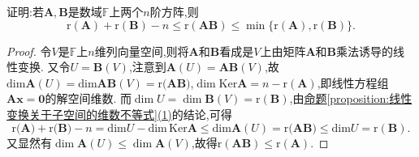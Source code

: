 \documentclass[../../main.tex]{subfiles}
\begin{document}
\begin{example}\label{example:4.243456}
证明:若\(\boldsymbol{A},\boldsymbol{B}\)是数域\(\mathbb{F}\)上两个\(n\)阶方阵,则
\[
\text{r}(\boldsymbol{A})+\text{r}(\boldsymbol{B})-n\leqslant \text{r}(\boldsymbol{A}\boldsymbol{B})\leqslant \min\{\text{r}(\boldsymbol{A}),\text{r}(\boldsymbol{B})\}.
\]
\end{example}
\begin{proof}
令\(V\)是\(\mathbb{F}\)上\(n\)维列向量空间,则将\(\boldsymbol{A}\)和\(\boldsymbol{B}\)看成是\(V\)上由矩阵\(\boldsymbol{A}\)和\(\boldsymbol{B}\)乘法诱导的线性变换. 又令\(U = \boldsymbol{B}(V)\),注意到\(\boldsymbol{A}(U)=\boldsymbol{A}\boldsymbol{B}(V)\),故\(\mathrm{dim}\boldsymbol{A}(U)=\mathrm{dim}\boldsymbol{AB}(V)=\mathrm{r(}\boldsymbol{AB})\),\(\dim\text{Ker}\boldsymbol{A}=n - \text{r}(\boldsymbol{A})\),即线性方程组\(\boldsymbol{A}\boldsymbol{x}=\boldsymbol{0}\)的解空间维数. 而\(\dim U=\dim\boldsymbol{B}(V)=\text{r}(\boldsymbol{B})\),由\hyperref[proposition:线性变换关于子空间的维数不等式]{命题\ref{proposition:线性变换关于子空间的维数不等式}(1)}的结论,可得
\[
\mathrm{r(}\boldsymbol{A})+\mathrm{r(}\boldsymbol{B})-n=\mathrm{dim}U-\mathrm{dim}\,\mathrm{Ker}\boldsymbol{A}\leqslant \mathrm{dim}\boldsymbol{A}\left( U \right) =\mathrm{r(}\boldsymbol{AB})\leqslant \mathrm{dim}U=\mathrm{r}\left( \boldsymbol{B} \right).
\]
又显然有\(\dim\boldsymbol{A}(U)\leqslant \dim\boldsymbol{A}(V)\),故得\(\text{r}(\boldsymbol{A}\boldsymbol{B})\leqslant \text{r}(\boldsymbol{A})\).
\end{proof}
\end{document}
